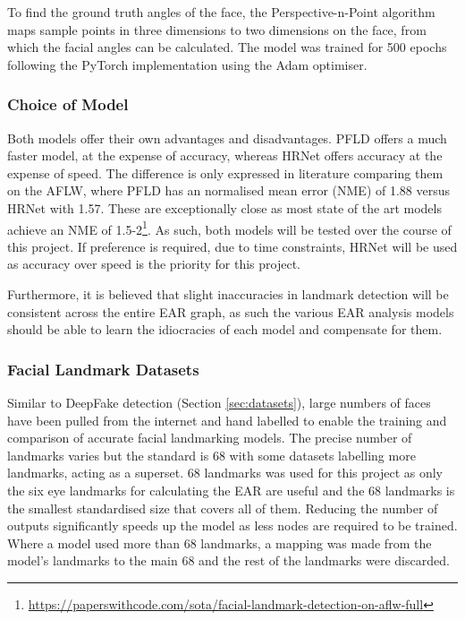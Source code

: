 To find the ground truth angles of the face, the Perspective-n-Point algorithm\cite{mallick2016head}\cite{hou2018face} maps sample points in three dimensions to two dimensions on the face, from which the facial angles can be calculated. The model was trained for 500 epochs following the PyTorch implementation\cite{zhang2016joint} using the Adam\cite{kingma2014adam} optimiser.

\subsubsection{Choice of Model}

Both models offer their own advantages and disadvantages. PFLD offers a much faster model, at the expense of accuracy, whereas HRNet offers accuracy at the expense of speed. The difference is only expressed in literature comparing them on the AFLW\cite{koestinger2011annotated}, where PFLD has an normalised mean error (NME) of 1.88 versus HRNet with 1.57. These are exceptionally close as most state of the art models achieve an NME of 1.5-2\footnote{\url{https://paperswithcode.com/sota/facial-landmark-detection-on-aflw-full}}. As such, both models will be tested over the course of this project. If preference is required, due to time constraints, HRNet will be used as accuracy over speed is the priority for this project.

Furthermore, it is believed that slight inaccuracies in landmark detection will be consistent across the entire EAR graph, as such the various EAR analysis models should be able to learn the idiocracies of each model and compensate for them.

\subsubsection{Facial Landmark Datasets}
\label{sec:face-datasets}


Similar to DeepFake detection (Section \ref{sec:datasets}), large numbers of faces have been pulled from the internet and hand labelled to enable the training and comparison of accurate facial landmarking models. The precise number of landmarks varies but the standard is 68 with some datasets labelling more landmarks, acting as a superset. 68 landmarks was used for this project as only the six eye landmarks for calculating the EAR are useful and the 68 landmarks is the smallest standardised size that covers all of them. Reducing the number of outputs significantly speeds up the model as less nodes are required to be trained. Where a model used more than 68 landmarks, a mapping was made from the model's landmarks to the main 68 and the rest of the landmarks were discarded.

